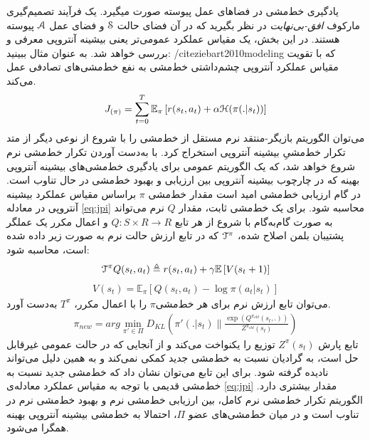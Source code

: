 یادگیری خط‌مشی در فضاهای عمل پیوسته صورت می\nf گیرد. یک فرآیند تصمیم‌گیری مارکوف 
\textit{افق-بی‌نهایت}
 در نظر بگیرید که در آن فضای حالت
$\EuScript{S}$
   و فضای عمل
   $\EuScript{A}$
    پیوسته هستند.
در این بخش، یک مقیاس عملکرد عمومی‌تر یعنی بیشینه آنتروپی معرفی و بررسی خواهد شد.
به عنوان مثال ببینید: 
/cite{ziebart2010modeling}
که با تقویت مقیاس عملکرد آنتروپی چشم‌داشتی خط‌مشی به نفع خط‌مشی‌های تصادفی عمل می‌کند.
\begin{align}
J_{(\pi)}= \sum\limits_{t=0}^T \mathbb{E}_\pi \left[ r(s_t , a_t) + \alpha \EuScript{H} (\pi(.|s_t)) \right]
\label{eq:jpi}
\end{align}
می‌توان الگوریتم بازیگر-منتقد نرم مستقل از خط‌مشی را با شروع از نوعی دیگر از متد تکرار خط‌مشیِ بیشینه آنتروپی استخراج کرد.
با به‌دست آوردن تکرار خط‌مشی نرم شروع خواهد شد، که یک الگوریتم عمومی برای یادگیری خط‌مشی‌های بیشینه آنتروپی بهینه که در چارچوب بیشینه آنتروپی بین ارزیابی و بهبود خط‌مشی در حال تناوب است.
در گام ارزیابی خط‌مشی امید است مقدار خط‌مشی
$\pi$
 براساس مقیاس عملکرد بیشینه آنتروپی در معادله \ref{eq:jpi} محاسبه شود. برای یک خط‌مشی ثابت، مقدار $Q$  نرم می‌تواند به صورت گام‌به‌گام با شروع از هر تابع
  $Q:S \times R \rightarrow R$ 
 و اعمال مکرر یک عملگر پشتیبان بلمن اصلاح شده،
 $\EuScript{T}^\pi$
  که در تابع ارزش حالت نرم به صورت زیر داده شده است، محاسبه شود:
\begin{align}
\EuScript{T}^\pi Q(s_t,a_t) \triangleq r(s_t,a_t)+\gamma \mathbb{E} \left[ V(s_t+1) \right]
\label{eq:tpi}
\end{align}
\begin{align}
V(s_t)= \mathbb{E}_\pi \left[ Q(s_t,a_t)- \log \pi(a_t | s_t) \right]
\end{align}
می‌توان تابع ارزش نرم برای هر خط‌مشی$\pi$ را با اعمال مکرر، $T^\pi$ به‌دست آورد.
\begin{align}
\pi_{new} = arg \min_{\pi' \in \Pi} D_{KL}  \left( \pi'(.|s_t) \parallel \frac{\exp{(Q^{\pi_{old}} (s_t,.))}}{Z^{\pi_{old}} (s_t)}\right)
\label{eq:pinew}
\end{align}
تابع پارش 
$Z^\pi (s_t)$
توزیع را یکنواخت می‌کند و از آنجایی که در حالت عمومی غیرقابل حل است، به گرادیان نسبت به خط‌مشی جدید کمکی نمی‌کند و به همین دلیل می‌تواند نادیده گرفته شود. برای این تابع می‌توان نشان داد که خط‌مشی جدید نسبت به خط‌مشی قدیمی با توجه به مقیاس عملکرد معادله‌ی \ref{eq:jpi} مقدار بیشتری دارد. 
الگوریتم تکرار خط‌مشی نرم کامل، بین ارزیابی خط‌مشی نرم و بهبود خط‌مشی نرم در تناوب است و در میان خط‌مشی‌های عضو
$\Pi$،
احتمالا به خط‌مشی بیشینه آنتروپی بهینه همگرا می‌شود.
